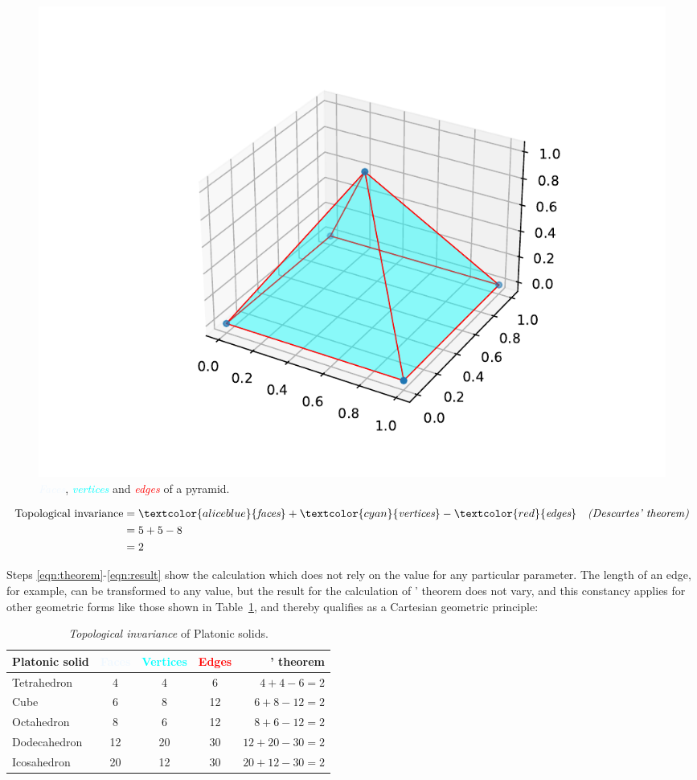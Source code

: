 \documentclass[a4paper, 12pt]{article}
\begin{document}
\begin{figure}[!h]
    \centering
    \includegraphics[width=0.8\linewidth]{topological}
    \caption{\textcolor{aliceblue}{\textit{Faces}}, \textcolor{cyan}{\textit{vertices}} and \textcolor{red}{\textit{edges}} of a pyramid.}
    \label{fig:topological}
\end{figure}

\begin{align}
    \text{Topological invariance} & = \textcolor{aliceblue}{\textit{faces}} + \textcolor{cyan}{\textit{vertices}} - \textcolor{red}{\textit{edges}}  && \textit{(Descartes' theorem)} \label{eqn:theorem} \\
    & = 5 + 5 - 8 \label{eqn:calc} \\
    & = 2  \label{eqn:result}
\end{align}

Steps \ref{eqn:theorem}-\ref{eqn:result} show the calculation which does not rely on the value for any particular parameter. The length of an edge, for example, can be transformed to any value, but the result for the calculation of \citeauthor{descartes_principles_1982}' theorem does not vary, and this constancy applies for other geometric forms like those shown in Table~\ref{tab:topological}, and thereby qualifies as a Cartesian geometric principle:

\begin{table}[h!]
    \small 
    \centering
    \begin{tabular}{lcccr} 
        \textbf{Platonic solid} & \textcolor{aliceblue}{\textbf{Faces}} & \textcolor{cyan}{\textbf{Vertices}} & \textcolor{red}{\textbf{Edges}} & \textbf{\citeauthor{descartes_principles_1982}' theorem} \\
        \hline
        Tetrahedron & 4 & 4 & 6 & \(4 + 4 - 6 =  2 \)  \\	
        Cube & 6 & 8 & 12 & \(6 + 8 - 12 =  2 \)  \\	
        Octahedron & 8 & 6 & 12 & \(8 + 6 - 12 =  2 \)  \\	
        Dodecahedron & 12 & 20 & 30 & \(12 + 20 - 30 =  2 \)  \\	
        Icosahedron & 20 & 12 & 30 & \(20 + 12 - 30 =  2 \)   \\
        \hline
    \end{tabular}
    \caption{\textit{Topological invariance} of Platonic solids.}
    \label{tab:topological}
\end{table}
\end{document}
